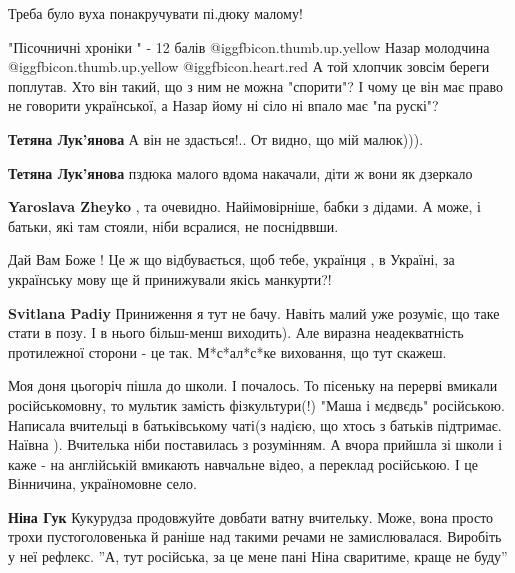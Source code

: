 \begin{itemize}
Треба було вуха понакручувати пі.дюку малому!


"Пісочничні хроніки " - 12 балів  @igg{fbicon.thumb.up.yellow}  Назар молодчина
@igg{fbicon.thumb.up.yellow} @igg{fbicon.heart.red} А той хлопчик зовсім береги
поплутав. Хто він такий, що з ним не можна "спорити"? І чому це він має право
не говорити української, а Назар йому ні сіло ні впало має "па рускі"?

\begin{itemize} %
\textbf{Тетяна Лук'янова} А він не здасться!.. От видно, що мій малюк))).

\textbf{Тетяна Лук'янова} пздюка малого вдома накачали, діти ж вони як дзеркало

\textbf{Yaroslava Zheyko} , та очевидно. Найімовірніше, бабки з дідами. А може, і батьки, які там стояли, ніби всралися, не поснідввши.
\end{itemize} %


Дай Вам Боже ! Це ж що відбувається, щоб тебе, українця , в Україні, за
українську мову ще й принижували якісь манкурти?!

\begin{itemize} %
\textbf{Svitlana Padiy} Приниження я тут не бачу. Навіть малий уже розуміє, що таке стати в позу. І в нього більш-менш виходить). Але виразна неадекватність протилежної сторони - це так. М*с*ал*с*ке виховання, що тут скажеш.
\end{itemize} %


Моя доня цьогоріч пішла до школи. І почалось. То пісеньку на перерві вмикали
російськомовну, то мультик замість фізкультури(!) "Маша і мєдвєдь" російською.
Написала вчительці в батьківському чаті(з надією, що хтось з батьків підтримає.
Наївна ). Вчителька ніби поставилась з розумінням. А вчора прийшла зі школи і
каже - на англійській вмикають навчальне відео, а переклад російською. І це
Вінничина, україномовне село.

\begin{itemize} %
\textbf{Ніна Гук} Кукурудза продовжуйте довбати ватну вчительку. Може, вона просто трохи пустоголовенька й раніше над такими речами не замислювалася.
Виробіть у неї рефлекс. ''А, тут російська, за це мене пані Ніна сваритиме, краще не буду''


\end{itemize}
\end{itemize}
